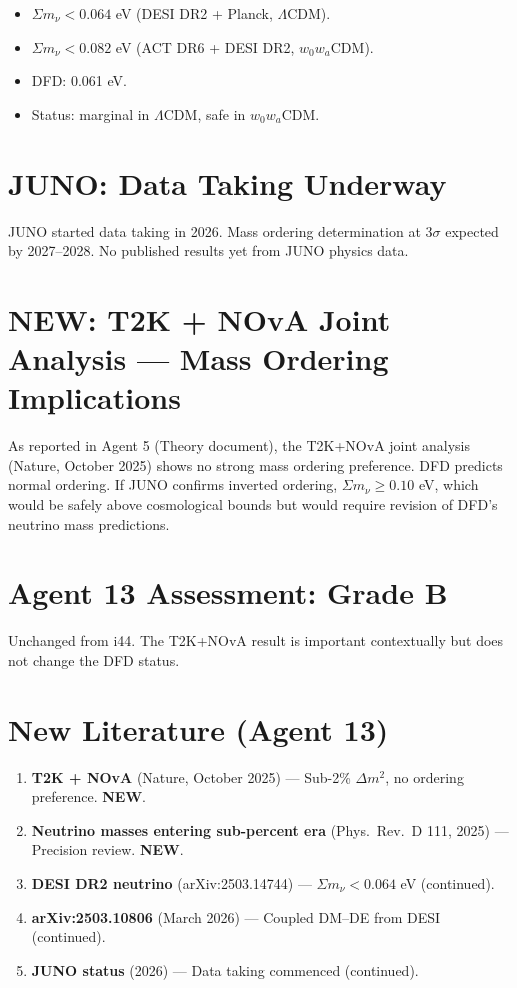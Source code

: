 \documentclass[11pt,a4paper]{article}
\newcommand{\NEW}{\textcolor{dfdblue}{\textbf{NEW}}}
\begin{document}
\begin{itemize}
\item $\Sigma m_\nu < 0.064$ eV (DESI DR2 + Planck, $\Lambda$CDM).
\item $\Sigma m_\nu < 0.082$ eV (ACT DR6 + DESI DR2, $w_0 w_a$CDM).
\item DFD: 0.061 eV.
\item Status: marginal in $\Lambda$CDM, safe in $w_0 w_a$CDM.
\end{itemize}

\section{JUNO: Data Taking Underway}

JUNO started data taking in 2026. Mass ordering determination at $3\sigma$ expected by 2027--2028. No published results yet from JUNO physics data.

\section{\NEW: T2K + NOvA Joint Analysis --- Mass Ordering Implications}

As reported in Agent 5 (Theory document), the T2K+NOvA joint analysis (Nature, October 2025) shows no strong mass ordering preference. DFD predicts normal ordering. If JUNO confirms inverted ordering, $\Sigma m_\nu \geq 0.10$ eV, which would be safely above cosmological bounds but would require revision of DFD's neutrino mass predictions.

\section{Agent 13 Assessment: Grade B}

Unchanged from i44. The T2K+NOvA result is important contextually but does not change the DFD status.

\section{New Literature (Agent 13)}

\begin{enumerate}
\item \textbf{T2K + NOvA} (Nature, October 2025) --- Sub-2\% $\Delta m^2$, no ordering preference. \NEW.
\item \textbf{Neutrino masses entering sub-percent era} (Phys.\ Rev.\ D 111, 2025) --- Precision review. \NEW.
\item \textbf{DESI DR2 neutrino} (arXiv:2503.14744) --- $\Sigma m_\nu < 0.064$ eV (continued).
\item \textbf{arXiv:2503.10806} (March 2026) --- Coupled DM--DE from DESI (continued).
\item \textbf{JUNO status} (2026) --- Data taking commenced (continued).
\end{enumerate}
\end{document}
